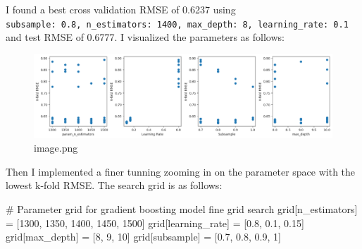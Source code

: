 \documentclass[
  letterpaper,
  DIV=11,
  numbers=noendperiod]{scrartcl}
\newenvironment{Shaded}{\begin{snugshade}}{\end{snugshade}}
\newcommand{\CommentTok}[1]{\textcolor[rgb]{0.37,0.37,0.37}{#1}}
\newcommand{\DecValTok}[1]{\textcolor[rgb]{0.68,0.00,0.00}{#1}}
\newcommand{\FloatTok}[1]{\textcolor[rgb]{0.68,0.00,0.00}{#1}}
\newcommand{\NormalTok}[1]{\textcolor[rgb]{0.00,0.23,0.31}{#1}}
\newcommand{\OperatorTok}[1]{\textcolor[rgb]{0.37,0.37,0.37}{#1}}
\newcommand{\StringTok}[1]{\textcolor[rgb]{0.13,0.47,0.30}{#1}}
\begin{document}
I found a best cross validation RMSE of 0.6237 using
\texttt{\textquotesingle{}subsample\textquotesingle{}:\ 0.8,\ \textquotesingle{}n\_estimators\textquotesingle{}:\ 1400,\ \textquotesingle{}max\_depth\textquotesingle{}:\ 8,\ \textquotesingle{}learning\_rate\textquotesingle{}:\ 0.1}
and test RMSE of 0.6777. I visualized the parameters as follows:

\begin{figure}

{\centering \includegraphics{Project_Report_Saturn_files/figure-pdf/image.png}

}

\caption{image.png}

\end{figure}

Then I implemented a finer tunning zooming in on the parameter space
with the lowest k-fold RMSE. The search grid is as follows:

\begin{Shaded}
\begin{Highlighting}[]
\CommentTok{\# Parameter grid for gradient boosting model fine grid search}
\NormalTok{grid[}\StringTok{\textquotesingle{}n\_estimators\textquotesingle{}}\NormalTok{] }\OperatorTok{=}\NormalTok{ [}\DecValTok{1300}\NormalTok{, }\DecValTok{1350}\NormalTok{, }\DecValTok{1400}\NormalTok{, }\DecValTok{1450}\NormalTok{, }\DecValTok{1500}\NormalTok{]}
\NormalTok{grid[}\StringTok{\textquotesingle{}learning\_rate\textquotesingle{}}\NormalTok{] }\OperatorTok{=}\NormalTok{ [}\FloatTok{0.8}\NormalTok{, }\FloatTok{0.1}\NormalTok{, }\FloatTok{0.15}\NormalTok{]}
\NormalTok{grid[}\StringTok{\textquotesingle{}max\_depth\textquotesingle{}}\NormalTok{] }\OperatorTok{=}\NormalTok{ [}\DecValTok{8}\NormalTok{, }\DecValTok{9}\NormalTok{, }\DecValTok{10}\NormalTok{]}
\NormalTok{grid[}\StringTok{\textquotesingle{}subsample\textquotesingle{}}\NormalTok{] }\OperatorTok{=}\NormalTok{ [}\FloatTok{0.7}\NormalTok{, }\FloatTok{0.8}\NormalTok{, }\FloatTok{0.9}\NormalTok{, }\DecValTok{1}\NormalTok{]}
\end{Highlighting}
\end{Shaded}
\end{document}
